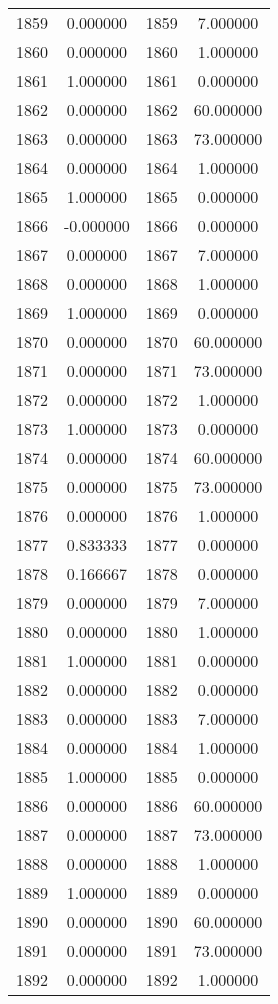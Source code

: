 \documentclass[12pt]{article}
\begin{document}
\begin{longtable}{@{}cccc@{}}
1859 & 0.000000 & 1859 & 7.000000 \\
1860 & 0.000000 & 1860 & 1.000000 \\
1861 & 1.000000 & 1861 & 0.000000 \\
1862 & 0.000000 & 1862 & 60.000000 \\
1863 & 0.000000 & 1863 & 73.000000 \\
1864 & 0.000000 & 1864 & 1.000000 \\
1865 & 1.000000 & 1865 & 0.000000 \\
1866 & -0.000000 & 1866 & 0.000000 \\
1867 & 0.000000 & 1867 & 7.000000 \\
1868 & 0.000000 & 1868 & 1.000000 \\
1869 & 1.000000 & 1869 & 0.000000 \\
1870 & 0.000000 & 1870 & 60.000000 \\
1871 & 0.000000 & 1871 & 73.000000 \\
1872 & 0.000000 & 1872 & 1.000000 \\
1873 & 1.000000 & 1873 & 0.000000 \\
1874 & 0.000000 & 1874 & 60.000000 \\
1875 & 0.000000 & 1875 & 73.000000 \\
1876 & 0.000000 & 1876 & 1.000000 \\
1877 & 0.833333 & 1877 & 0.000000 \\
1878 & 0.166667 & 1878 & 0.000000 \\
1879 & 0.000000 & 1879 & 7.000000 \\
1880 & 0.000000 & 1880 & 1.000000 \\
1881 & 1.000000 & 1881 & 0.000000 \\
1882 & 0.000000 & 1882 & 0.000000 \\
1883 & 0.000000 & 1883 & 7.000000 \\
1884 & 0.000000 & 1884 & 1.000000 \\
1885 & 1.000000 & 1885 & 0.000000 \\
1886 & 0.000000 & 1886 & 60.000000 \\
1887 & 0.000000 & 1887 & 73.000000 \\
1888 & 0.000000 & 1888 & 1.000000 \\
1889 & 1.000000 & 1889 & 0.000000 \\
1890 & 0.000000 & 1890 & 60.000000 \\
1891 & 0.000000 & 1891 & 73.000000 \\
1892 & 0.000000 & 1892 & 1.000000 \\

\end{longtable}
\end{document}
